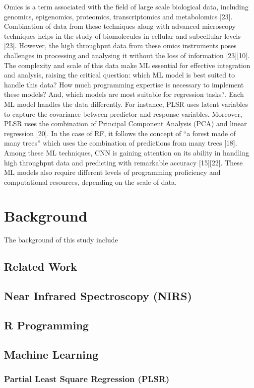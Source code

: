 \documentclass[12pt,a4paper]{report}
\begin{document}
Omics is a term associated with the field of large scale biological data, including genomics, epigenomics, proteomics, transcriptomics and metabolomics [23]. Combination of data from these techniques along with advanced microscopy techniques helps in the study of biomolecules in cellular and subcellular levels [23]. However, the high throughput data from these omics instruments poses challenges in processing and analysing it without the loss of information [23][10]. 
The complexity and scale of this data make ML essential for effective integration and analysis, raising the critical question: which ML model is best suited to handle this data? How much programming expertise is necessary to implement these models? And, which models are most suitable for regression tasks?. Each ML model handles the data differently. For instance, PLSR uses latent variables to capture the covariance between predictor and response variables. Moreover, 
PLSR uses the combination of Principal Component Analysis (PCA) and linear regression [20]. In the case of RF, it follows the concept of “a forest made of many trees” which uses the combination of predictions from many trees [18]. Among these ML techniques, CNN is gaining attention on its ability in handling high throughput data and predicting with remarkable accuracy [15][22]. These ML models also require different levels of programming proficiency and computational resources, depending on the scale of data. \\


\chapter{Background}
The background of this study include
\section{Related Work}
\section{Near Infrared Spectroscopy (NIRS)}
\section{R Programming}
\section{Machine Learning}
\subsection{Partial Least Square Regression (PLSR)}
\end{document}
